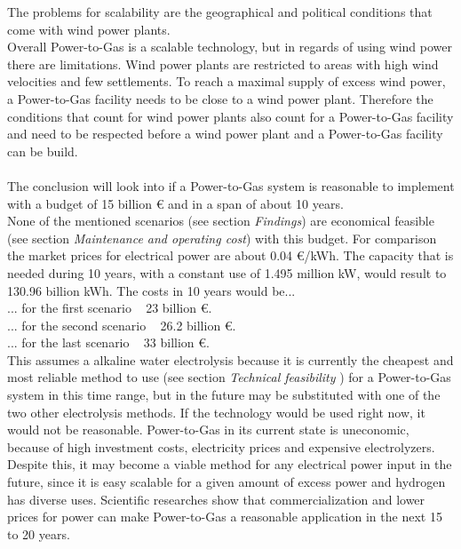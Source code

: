 \documentclass[11pt,a4paper]{article}
\begin{document}
\begin{parcolumns}[colwidths={1=2.5 cm, 2=10 cm, 3=2.5 cm}]{3}
{The problems for scalability are the geographical and political conditions that come with wind power plants.\\
Overall Power-to-Gas is a scalable technology, but in regards of using wind power there are limitations. Wind power plants are restricted to areas with high wind velocities and few settlements. To reach a maximal supply of excess wind power, a Power-to-Gas facility needs to be close to a wind power plant. Therefore the conditions that count for wind power plants also count for a Power-to-Gas facility and need to be respected before a wind power plant and a Power-to-Gas facility can be build.\\ \\
The conclusion will look into if a Power-to-Gas system is reasonable to implement with a budget of 15 billion \euro{ } and in a span of about 10 years.\\
None of the mentioned scenarios (see section \textit{Findings}) are economical feasible (see section \textit{Maintenance and operating cost}) with this budget. For comparison the market prices for electrical power are about 0.04 \euro /kWh. The capacity that is needed during 10 years, with a constant use of 1.495 million kW, would result to 130.96 billion kWh. The costs in 10 years would be... \\
... for the first scenario ~ 23 billion \euro .\\
... for the second scenario ~ 26.2 billion \euro .\\
... for the last scenario ~ 33 billion \euro . \\
This assumes a alkaline water electrolysis because it is currently the cheapest and most reliable method to use (see section \textit{Technical feasibility} ) for a Power-to-Gas system in this time range, but in the future may be substituted with one of the two other electrolysis methods.
If the technology would be used right now, it would not be reasonable. Power-to-Gas in its current state is uneconomic, because of high investment costs, electricity prices and expensive electrolyzers. Despite this, it may become a viable method for any electrical power input in the future, since it is easy scalable for a given amount of excess power and hydrogen has diverse uses. Scientific researches show that commercialization and lower prices for power can make Power-to-Gas a reasonable application in the next 15 to 20 years.
}


\end{parcolumns}
\end{document}
